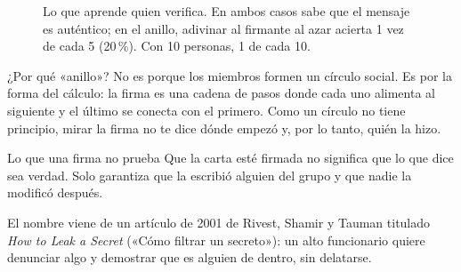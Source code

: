 \documentclass[11pt,a4paper]{article}
\theoremstyle{definition}
\theoremstyle{plain}
\theoremstyle{remark}
\begin{document}
\begin{figure}[htbp]
\centering
{}
\caption{Lo que aprende quien verifica. En ambos casos sabe que el mensaje es
auténtico; en el anillo, adivinar al firmante al azar acierta 1 vez de cada 5
(20\,\%). Con 10 personas, 1 de cada 10.}
\label{fig:comparacion}
\end{figure}

\begin{clave}{¿Por qué «anillo»?}
No es porque los miembros formen un círculo social. Es por la forma del cálculo: la
firma es una cadena de pasos donde cada uno alimenta al siguiente y el último se
conecta con el primero. Como un círculo no tiene principio, mirar la firma no te
dice dónde empezó y, por lo tanto, quién la hizo.
\end{clave}

\begin{aviso}{Lo que una firma no prueba}
Que la carta esté firmada no significa que lo que dice sea verdad. Solo garantiza
que la escribió alguien del grupo y que nadie la modificó después.
\end{aviso}

El nombre viene de un artículo de 2001 de Rivest, Shamir y Tauman titulado
\emph{How to Leak a Secret} («Cómo filtrar un secreto»): un alto funcionario quiere
denunciar algo y demostrar que es alguien de dentro, sin delatarse.
\end{document}
